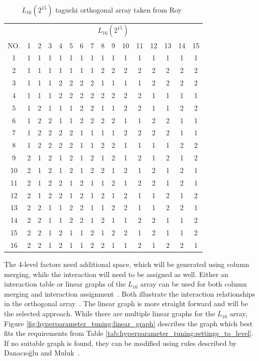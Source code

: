 \begin{table}[ht]
	\centering
	\begin{tabular}{ |c||c|c|c|c|c|c|c|c|c|c|c|c|c|c|c|  }
		\hline
		   & \multicolumn{15}{c|}{ $L_{16}(2^{15})$ } \\
		NO.& 1 & 2 & 3 & 4 & 5 & 6 & 7 & 8 & 9 & 10& 11& 12& 13& 14&15\\
		\hline
		1  & 1 & 1 & 1 & 1 & 1 & 1 & 1 & 1 & 1 & 1 & 1 & 1 & 1 & 1 & 1\\
		2  & 1 & 1 & 1 & 1 & 1 & 1 & 1 & 2 & 2 & 2 & 2 & 2 & 2 & 2 & 2\\
		3  & 1 & 1 & 1 & 2 & 2 & 2 & 2 & 1 & 1 & 1 & 1 & 2 & 2 & 2 & 2\\
		4  & 1 & 1 & 1 & 2 & 2 & 2 & 2 & 2 & 2 & 2 & 2 & 1 & 1 & 1 & 1\\
		5  & 1 & 2 & 1 & 1 & 1 & 2 & 2 & 1 & 1 & 2 & 2 & 1 & 1 & 2 & 2\\
		6  & 1 & 2 & 2 & 1 & 1 & 2 & 2 & 2 & 2 & 1 & 1 & 2 & 2 & 1 & 1\\
		7  & 1 & 2 & 2 & 2 & 2 & 1 & 1 & 1 & 1 & 2 & 2 & 2 & 2 & 1 & 1\\
		8  & 1 & 2 & 2 & 2 & 2 & 1 & 1 & 2 & 2 & 1 & 1 & 1 & 1 & 2 & 2\\
		9  & 2 & 1 & 2 & 1 & 2 & 1 & 2 & 1 & 2 & 1 & 2 & 1 & 2 & 1 & 2\\
		10 & 2 & 1 & 2 & 1 & 2 & 1 & 2 & 2 & 1 & 2 & 1 & 2 & 1 & 2 & 1\\
		11 & 2 & 1 & 2 & 2 & 1 & 2 & 1 & 1 & 2 & 1 & 2 & 2 & 1 & 2 & 1\\
		12 & 2 & 1 & 2 & 2 & 1 & 2 & 1 & 2 & 1 & 2 & 1 & 1 & 2 & 1 & 2\\
		13 & 2 & 2 & 1 & 1 & 2 & 2 & 1 & 1 & 2 & 2 & 1 & 1 & 2 & 2 & 1\\
		14 & 2 & 2 & 1 & 1 & 2 & 2 & 1 & 2 & 1 & 1 & 2 & 2 & 1 & 1 & 2\\
		15 & 2 & 2 & 1 & 2 & 1 & 1 & 2 & 1 & 2 & 2 & 1 & 2 & 1 & 1 & 2\\
		16 & 2 & 2 & 1 & 2 & 1 & 1 & 2 & 2 & 1 & 1 & 2 & 1 & 2 & 2 & 1\\
		\hline
	\end{tabular}
	\caption{ $L_{16}(2^{15})$ taguchi orthogonal array taken from Roy~\cite{roy_primer_1990}}
	\label{tab:hyperparameter_tuning:L16_orhtogonal_array}
\end{table}

The 4-level factors need additional space, which will be generated using column merging, while the interaction will need to be assigned as well.
Either an interaction table or linear graphs of the $L_{16}$ array can be used for both column merging and interaction assignment~\cite{danacioglu_taguchi_2005}. Both illustrate the interaction relationships in the orthogonal array~\cite{yang_design_2009}.
The linear graph is more straight forward and will be the selected approach. While there are multiple linear graphs for the $L_{16}$ array, Figure \ref{fig:hyperparameter_tuning:linear_graph} describes the graph which best fits the requirements from Table \ref{tab:hyperparameter_tuning:settings_to_level}. If no suitable graph is found, they can be modified using rules described by Danacıoğlu and Muluk~\cite{danacioglu_taguchi_2005}.


